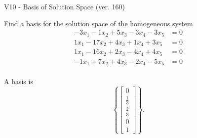 \begin{exercise}
  \begin{exerciseTitle}V10 - Basis of Solution Space (ver. 160)\end{exerciseTitle}
  \begin{exerciseStatement}
    Find a basis for the solution space of the homogeneous system 
\begin{align*}
 -3 x_ 1 -1 x_ 2 + 5 x_ 3 -3 x_ 4 -3 x_ 5 &= 0  \\ 
  1 x_ 1 -17 x_ 2 + 4 x_ 3 + 1 x_ 4 + 3 x_ 5 &= 0  \\ 
  1 x_ 1 -16 x_ 2 + 2 x_ 3 -4 x_ 4 + 4 x_ 5 &= 0  \\ 
  -1 x_ 1 + 7 x_ 2 + 4 x_ 3 -2 x_ 4 -5 x_ 5 &= 0  \\ 
 \end{align*}


 
  \end{exerciseStatement}

  \begin{exerciseAnswer}
   A basis is   
\[\left\{\left[\begin{array}{c}
0 \\
\frac{1}{3} \\
\frac{2}{3} \\
0 \\
1
\end{array}\right]\right\}.\]

  


  \end{exerciseAnswer}
\end{exercise}